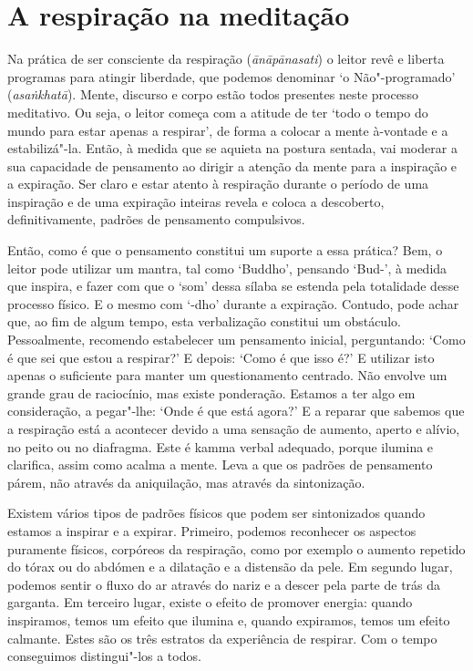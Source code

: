 \section{A respiração na meditação}

Na prática de ser consciente da respiração (\emph{ānāpānasati}) o leitor revê e
liberta programas para atingir liberdade, que podemos denominar `o
Não"-programado' (\emph{asaṅkhatā}). Mente, discurso e corpo estão todos
presentes neste processo meditativo. Ou seja, o leitor começa com a atitude de
ter `todo o tempo do mundo para estar apenas a respirar', de forma a colocar a
mente à-vontade e a estabilizá"-la. Então, à medida que se aquieta na postura
sentada, vai moderar a sua capacidade de pensamento ao dirigir a atenção da
mente para a inspiração e a expiração. Ser claro e estar atento à respiração
durante o período de uma inspiração e de uma expiração inteiras revela e coloca
a descoberto, definitivamente, padrões de pensamento compulsivos.

Então, como é que o pensamento constitui um suporte a essa prática? Bem, o
leitor pode utilizar um mantra, tal como `Buddho', pensando `Bud-', à medida que
inspira, e fazer com que o `som' dessa sílaba se estenda pela totalidade desse
processo físico. E o mesmo com `-dho' durante a expiração. Contudo, pode achar
que, ao fim de algum tempo, esta verbalização constitui um obstáculo.
Pessoalmente, recomendo estabelecer um pensamento inicial, perguntando: `Como é
que sei que estou a respirar?' E depois: `Como é que isso é?' E utilizar isto
apenas o suficiente para manter um questionamento centrado. Não envolve um
grande grau de raciocínio, mas existe ponderação. Estamos a ter algo em
consideração, a pegar"-lhe: `Onde é que está agora?' E a reparar que sabemos que
a respiração está a acontecer devido a uma sensação de aumento, aperto e alívio,
no peito ou no diafragma. Este é kamma verbal adequado, porque ilumina e
clarifica, assim como acalma a mente. Leva a que os padrões de pensamento párem,
não através da aniquilação, mas através da sintonização.

Existem vários tipos de padrões físicos que podem ser sintonizados quando
estamos a inspirar e a expirar. Primeiro, podemos reconhecer os aspectos
puramente físicos, corpóreos da respiração, como por exemplo o aumento repetido
do tórax ou do abdómen e a dilatação e a distensão da pele. Em segundo lugar,
podemos sentir o fluxo do ar através do nariz e a descer pela parte de trás da
garganta. Em terceiro lugar, existe o efeito de promover energia: quando
inspiramos, temos um efeito que ilumina e, quando expiramos, temos um efeito
calmante. Estes são os três estratos da experiência de respirar. Com o tempo
conseguimos distingui"-los a todos.

